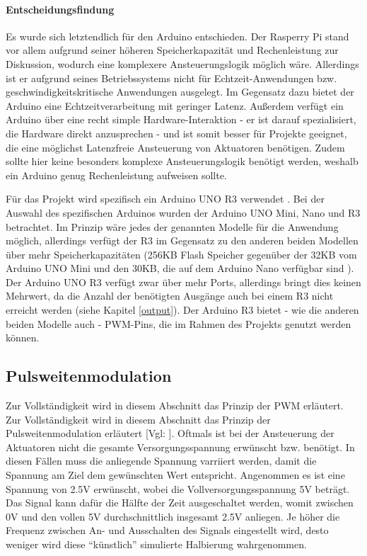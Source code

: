\paragraph{Entscheidungsfindung}
Es wurde sich letztendlich für den Arduino entschieden.
Der Rasperry Pi stand vor allem aufgrund seiner höheren Speicherkapazität und Rechenleistung zur Diskussion, wodurch eine komplexere Ansteuerungslogik möglich wäre.
Allerdings ist er aufgrund seines Betriebssystems nicht für Echtzeit-Anwendungen bzw. geschwindigkeitskritische Anwendungen ausgelegt.
Im Gegensatz dazu bietet der Arduino eine Echtzeitverarbeitung mit geringer Latenz.
Außerdem verfügt ein Arduino über eine recht simple Hardware-Interaktion - er ist darauf spezialisiert, die Hardware direkt anzusprechen - und ist somit besser für Projekte geeignet, die eine möglichst Latenzfreie Ansteuerung von Aktuatoren benötigen.
Zudem sollte hier keine besonders komplexe Ansteuerungslogik benötigt werden, weshalb ein Arduino genug Rechenleistung aufweisen sollte.

Für das Projekt wird spezifisch ein Arduino UNO R3 verwendet \cite[siehe][für die genaue Spezifikation]{ard.ArduinoR3Datasheet.24}.
Bei der Auswahl des spezifischen Arduinos wurden der Arduino UNO Mini, Nano und R3 betrachtet.
Im Prinzip wäre jedes der genannten Modelle für die Anwendung möglich, allerdings verfügt der R3 im Gegensatz zu den anderen beiden Modellen über mehr Speicherkapazitäten (256KB Flash Speicher
gegenüber der 32KB vom Arduino UNO Mini und den 30KB, die auf dem Arduino Nano verfügbar sind \cites[vgl.][]{ard.ArduinoR3Datasheet.24}{ard.ArduinoMiniDatasheet.24}{ard.ArduinoNanoDatasheet.24}).
Der Arduino UNO R3 verfügt zwar über mehr Ports, allerdings bringt dies keinen Mehrwert, da die Anzahl der benötigten Ausgänge auch bei einem R3 nicht erreicht werden
(siehe Kapitel \ref{output}).
Der Arduino R3 bietet - wie die anderen beiden Modelle auch - \ac{PWM}-Pins, die im Rahmen des Projekts genutzt werden können.


\subsection{Pulsweitenmodulation}\label{PWM}

Zur Vollständigkeit wird in diesem Abschnitt das Prinzip der \acf{PWM} erläutert.
Zur Vollständigkeit wird in diesem Abschnitt das Prinzip der Pulsweitenmodulation erläutert [Vgl: \cite*[siehe ][]{PWM}].
Oftmals ist bei der Ansteuerung der Aktuatoren nicht die gesamte Versorgungsspannung erwünscht bzw. benötigt.
In diesen Fällen muss die anliegende Spannung varriiert werden, damit die Spannung am Ziel dem gewünschten Wert entspricht.
Angenommen es ist eine Spannung von 2.5V erwünscht, wobei die Vollversorgungsspannung 5V beträgt.
Das Signal kann dafür die Hälfte der Zeit ausgeschaltet werden, womit zwischen 0V und den vollen 5V durchschnittlich insgesamt 2.5V anliegen.
Je höher die Frequenz zwischen An- und Ausschalten des Signals eingestellt wird, desto weniger wird diese \enquote{künstlich} simulierte Halbierung wahrgenommen.

